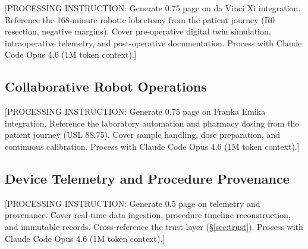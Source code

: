 [PROCESSING INSTRUCTION: Generate 0.75 page on da Vinci Xi integration. Reference the
168-minute robotic lobectomy from the patient journey (R0 resection, negative margins).
Cover pre-operative digital twin simulation, intraoperative telemetry, and post-operative
documentation. Process with Claude Code Opus 4.6 (1M token context).]

\subsection{Collaborative Robot Operations}

[PROCESSING INSTRUCTION: Generate 0.75 page on Franka Emika integration. Reference the
laboratory automation and pharmacy dosing from the patient journey (USL 88.75).
Cover sample handling, dose preparation, and continuous calibration.
Process with Claude Code Opus 4.6 (1M token context).]

\subsection{Device Telemetry and Procedure Provenance}

[PROCESSING INSTRUCTION: Generate 0.5 page on telemetry and provenance. Cover real-time
data ingestion, procedure timeline reconstruction, and immutable records.
Cross-reference the trust layer (\S\ref{sec:trust}).
Process with Claude Code Opus 4.6 (1M token context).]
